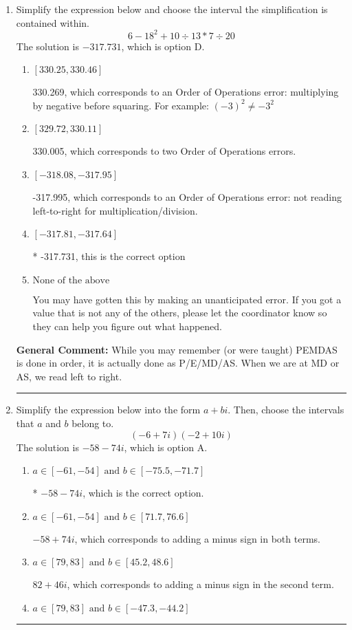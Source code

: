 \documentclass{extbook}[14pt]
\newcommand{\litem}[1]{\item #1

\rule{\textwidth}{0.4pt}}
\begin{document}
\begin{enumerate}\litem{
Simplify the expression below and choose the interval the simplification is contained within.
\[ 6 - 18^2 + 10 \div 13 * 7 \div 20 \]
The solution is \( -317.731 \), which is option D.\begin{enumerate}[label=\Alph*.]
\item \( [330.25, 330.46] \)

 330.269, which corresponds to an Order of Operations error: multiplying by negative before squaring. For example: $(-3)^2 \neq -3^2$
\item \( [329.72, 330.11] \)

 330.005, which corresponds to two Order of Operations errors.
\item \( [-318.08, -317.95] \)

 -317.995, which corresponds to an Order of Operations error: not reading left-to-right for multiplication/division.
\item \( [-317.81, -317.64] \)

* -317.731, this is the correct option
\item \( \text{None of the above} \)

 You may have gotten this by making an unanticipated error. If you got a value that is not any of the others, please let the coordinator know so they can help you figure out what happened.
\end{enumerate}

\textbf{General Comment:} While you may remember (or were taught) PEMDAS is done in order, it is actually done as P/E/MD/AS. When we are at MD or AS, we read left to right.
}
\litem{
Simplify the expression below into the form $a+bi$. Then, choose the intervals that $a$ and $b$ belong to.
\[ (-6 + 7 i)(-2 + 10 i) \]
The solution is \( -58 - 74 i \), which is option A.\begin{enumerate}[label=\Alph*.]
\item \( a \in [-61, -54] \text{ and } b \in [-75.5, -71.7] \)

* $-58 - 74 i$, which is the correct option.
\item \( a \in [-61, -54] \text{ and } b \in [71.7, 76.6] \)

 $-58 + 74 i$, which corresponds to adding a minus sign in both terms.
\item \( a \in [79, 83] \text{ and } b \in [45.2, 48.6] \)

 $82 + 46 i$, which corresponds to adding a minus sign in the second term.
\item \( a \in [79, 83] \text{ and } b \in [-47.3, -44.2] \)


\end{enumerate}}
\end{enumerate}
\end{document}
